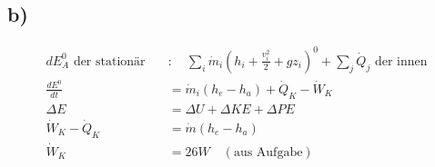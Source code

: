 

\subsection*{b)}

\begin{align*}
    dE_{A}^0 \text{ der stationär} \quad & : \quad \sum_i \dot{m}_i \left( h_i + \frac{v_i^2}{2} + g z_i \right)^0 + \sum_j \dot{Q}_j \text{ der innen} \\
    \frac{dE^0}{dt} & = \dot{m}_i (h_e - h_a) + \dot{Q}_K - \dot{W}_K \\
    \Delta E & = \Delta U + \Delta KE + \Delta PE \\
    \dot{W}_K - \dot{Q}_K & = \dot{m} (h_e - h_a) \\
    \dot{W}_K & = 26 W \quad (\text{aus Aufgabe})
\end{align*}